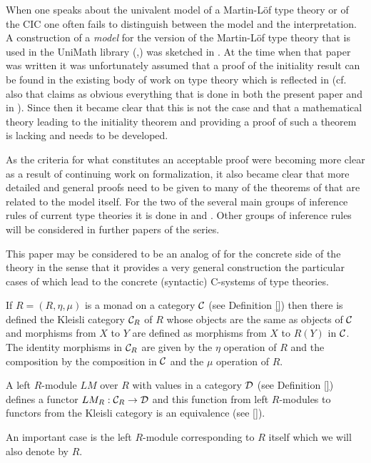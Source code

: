 \documentclass[11pt]{article}
\newcommand{\sr}{\rightarrow}
\begin{document}
When one speaks about the univalent model of a Martin-L\"{o}f type theory or of the CIC one often fails to distinguish between the model and the interpretation.  A construction of a {\em model} for the version of the Martin-L\"{o}f type theory that is used in the UniMath library (\cite{UniMath},\cite{UniMath2015})  was sketched in \cite{KLV1}. At the time when that paper was written it was unfortunately assumed that a proof of the initiality result can be found in the existing body of work on type theory which is reflected  in \cite[Theorem 1.2.9]{KLV1} (cf. also \cite[Example 1.2.3]{KLV1} that claims as obvious everything that is done in both the present paper and in \cite{Csubsystems}).  Since then it became clear that this is not the case and that a mathematical theory leading to the initiality theorem and providing a proof of such a theorem is lacking and needs to be developed. 

As the criteria for what constitutes an acceptable proof were becoming more clear as a result of continuing work on formalization, it also became clear that more detailed and general proofs need to be given to many of the theorems of \cite{KLV1} that are related to the model itself. For the two of the several main groups of inference rules of current type theories it is done in \cite{fromunivwithPi} and \cite{fromunivwithpaths}. Other groups of inference rules will be considered in further papers of the series. 

This paper may be considered to be an analog of \cite{Cfromauniverse} for the concrete side of the theory in the sense that it provides a very general construction the particular cases of which lead to the concrete (syntactic) C-systems of type theories. 

If $R=(R,\eta,\mu)$ is a monad on a category $\cal C$ (see Definition \ref{}) then there is defined the Kleisli category ${\cal C}_R$ of $R$ whose objects are the same as objects of $\cal C$ and morphisms from $X$ to $Y$ are defined as morphisms from $X$ to $R(Y)$ in $\cal C$. The identity morphisms in ${\cal C}_R$ are given by the $\eta$ operation of $R$ and the composition by the composition in $\cal C$ and the $\mu$ operation of $R$.

A left $R$-module $LM$  over $R$ with values in a category $\cal D$ (see Definition \ref{}) defines a functor $LM_R:{\cal C}_R\sr {\cal D}$ and this function from left $R$-modules to functors from the Kleisli category is an equivalence (see \ref{}). 

An important case is the left $R$-module corresponding to $R$ itself which we will also denote by $R$.   
\end{document}
